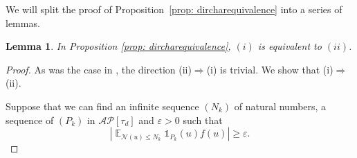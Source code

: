 \documentclass[11pt]{amsart}
\newtheorem{lemma}{Lemma}[section]
\theoremstyle{definition}
\DeclareMathOperator*{\E}{\mathbb{E}}
\newcommand{\NN}{{\mathcal N}}
\begin{document}
We will split the proof of Proposition~\ref{prop: dircharequivalence} into a series of lemmas.
\begin{lemma}
In Proposition \ref{prop: dircharequivalence}, $(i)$ is equivalent to $(ii)$.
\end{lemma}
\begin{proof}
As was the case in \cite[Appendix A]{S23}, %
the direction (ii)$\Rightarrow$(i) is trivial. We show that (i)$\Rightarrow$(ii).

Suppose that we can find an infinite sequence $(N_k)$ of natural numbers, a sequence of %
$(P_k)$ in $\mathcal{AP}[\tau_{d}]$ and $\varepsilon>0$ such that
\[
\left| \E_{ \NN(u) \leq N_k} \mathds{1}_{P_k}(u) f(u)\right| \geq \varepsilon.
\]



\end{proof}
\end{document}

